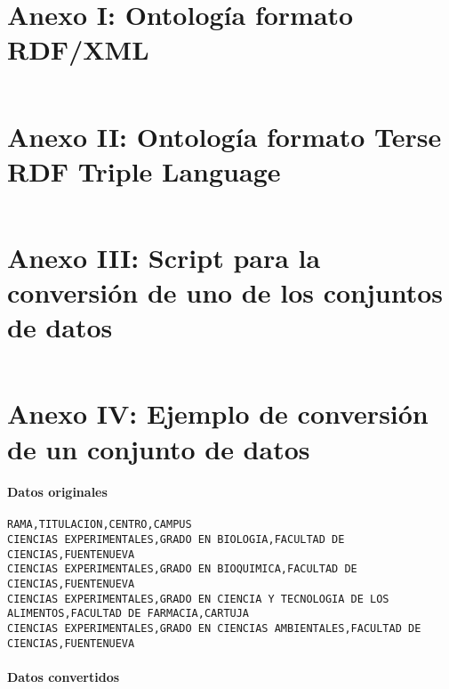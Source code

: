 \chapter*{Anexo I: Ontología formato RDF/XML}

\label{anexo_i}
\inputminted[tabsize=2,breaklines]{xml}{../../data/semantic/ontology/ugr.rdf}

\chapter*{Anexo II: Ontología formato Terse RDF Triple Language}
\label{anexo_ii}
\inputminted[tabsize=2,breaklines]{text}{../../data/semantic/ontology/ugr.ttl}

\chapter*{Anexo III: Script para la conversión de uno de los conjuntos de datos}
\label{anexo_iii}
\inputminted[tabsize=2,breaklines]{python}{../../data/scripts/OfertaTitulacion.py}

\chapter*{Anexo IV: Ejemplo de conversión de un conjunto de datos}
\label{anexo_iv}

\subsubsection{Datos originales}

\begin{verbatim}
RAMA,TITULACION,CENTRO,CAMPUS
CIENCIAS EXPERIMENTALES,GRADO EN BIOLOGI­A,FACULTAD DE CIENCIAS,FUENTENUEVA
CIENCIAS EXPERIMENTALES,GRADO EN BIOQUI­MICA,FACULTAD DE CIENCIAS,FUENTENUEVA
CIENCIAS EXPERIMENTALES,GRADO EN CIENCIA Y TECNOLOGI­A DE LOS ALIMENTOS,FACULTAD DE FARMACIA,CARTUJA
CIENCIAS EXPERIMENTALES,GRADO EN CIENCIAS AMBIENTALES,FACULTAD DE CIENCIAS,FUENTENUEVA
\end{verbatim}

\subsubsection{Datos convertidos}


